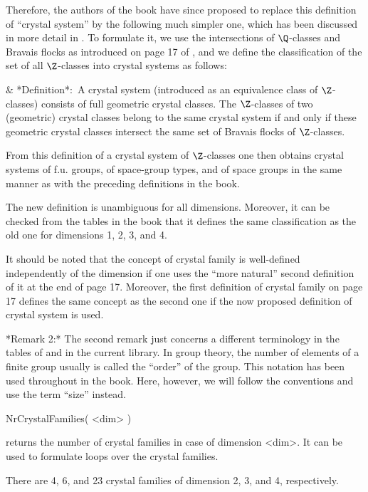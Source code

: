 Therefore,  the authors of  the book have  since proposed to replace this
definition of ``crystal system''  by the  following much simpler  one,
which has been discussed in more detail in \cite{NPW81}. To formulate it,
we use    the   intersections  of $\Q$-classes    and  Bravais  flocks as
introduced on page 17 of \cite{BBNWZ78}, and we define the classification
of the set of all $\Z$-classes into crystal systems as follows:

\beginitems
& *Definition*:\  A crystal system  (introduced as an  equivalence
  class  of   $\Z$-classes)   consists of  full  geometric  crystal
  classes.  The $\Z$-classes  of  two  (geometric)  crystal classes
  belong to the same crystal system  if and only if these geometric
  crystal  classes  intersect  the same  set of  Bravais  flocks of
  $\Z$-classes.
\enditems

From  this  definition  of  a  crystal system  of  $\Z$-classes  one then
obtains  crystal systems of f.u.  groups,  of space-group types, and of
space groups in the same manner as with the  preceding definitions in the
book.

The new definition is unambiguous for all dimensions. Moreover, it can be
checked  from  the   tables   in the  book   that  it   defines  the same
classification as the old one for dimensions 1, 2, 3, and 4.

It should  be noted that  the concept of  crystal  family is well-defined
independently of the dimension if one uses the ``more natural'' second
definition of it at the end of page 17. Moreover, the first definition of
crystal family on page  17 defines the same concept  as the second one if
the now proposed definition of crystal system is used.


*Remark 2:*
The second remark just concerns a  different terminology in the tables of
\cite{BBNWZ78} and in the current library. In group theory, the number of
elements of a  finite group  usually is  called  the ``order'' of  the
group.   This notation has  been  used throughout   in  the book.   Here,
however,  we  will follow the    {\GAP}   conventions and use  the   term
``size'' instead.



\>NrCrystalFamilies( <dim> )

returns the number of crystal families in case of dimension <dim>.  It
can be used to formulate loops over the crystal families.

There are 4, 6, and 23 crystal families of dimension 2, 3, and 4,
respectively.

